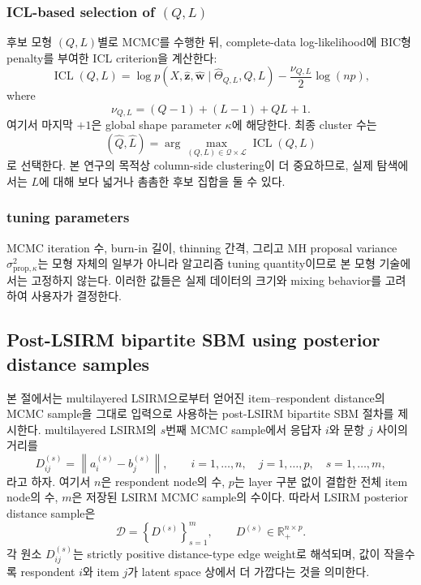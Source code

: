\documentclass[A4paper,11pt]{article}
\begin{document}
\subsubsection{ICL-based selection of $(Q,L)$}

후보 모형 $(Q,L)$별로 MCMC를 수행한 뒤, complete-data log-likelihood에 BIC형 penalty를 부여한 ICL criterion을 계산한다:
\[
\operatorname{ICL}(Q,L)
=
\log p(X,\hat{\mathbf{z}},\hat{\mathbf{w}}\mid \hat{\Theta}_{Q,L},Q,L)
-
\frac{\nu_{Q,L}}{2}\log(np),
\]
where
\[
\nu_{Q,L}=(Q-1)+(L-1)+QL+1.
\]
여기서 마지막 $+1$은 global shape parameter $\kappa$에 해당한다. 최종 cluster 수는
\[
(\hat Q,\hat L)
=
\arg\max_{(Q,L)\in\mathcal{Q}\times\mathcal{L}}
\operatorname{ICL}(Q,L)
\]
로 선택한다. 본 연구의 목적상 column-side clustering이 더 중요하므로, 실제 탐색에서는 $L$에 대해 보다 넓거나 촘촘한 후보 집합을 둘 수 있다.

\subsubsection{tuning parameters}

MCMC iteration 수, burn-in 길이, thinning 간격, 그리고 MH proposal variance $\sigma_{\text{prop},\kappa}^{2}$는 모형 자체의 일부가 아니라 알고리즘 tuning quantity이므로 본 모형 기술에서는 고정하지 않는다. 이러한 값들은 실제 데이터의 크기와 mixing behavior를 고려하여 사용자가 결정한다.



\subsection{Post-LSIRM bipartite SBM using posterior distance samples}

본 절에서는 multilayered LSIRM으로부터 얻어진 item--respondent distance의 MCMC sample을
그대로 입력으로 사용하는 post-LSIRM bipartite SBM 절차를 제시한다.
multilayered LSIRM의 $s$번째 MCMC sample에서 응답자 $i$와 문항 $j$ 사이의 거리를
\[
D^{(s)}_{ij}
=
\left\| a_i^{(s)} - b_j^{(s)} \right\|,
\qquad
i=1,\ldots,n,\quad j=1,\ldots,p,\quad s=1,\ldots,m,
\]
라고 하자. 여기서 $n$은 respondent node의 수, $p$는 layer 구분 없이 결합한 전체 item node의 수,
$m$은 저장된 LSIRM MCMC sample의 수이다. 따라서 LSIRM posterior distance sample은
\[
\mathcal{D}
=
\left\{D^{(s)}\right\}_{s=1}^m,
\qquad
D^{(s)} \in \mathbb{R}_{+}^{n \times p}.
\]
각 원소 $D^{(s)}_{ij}$는 strictly positive distance-type edge weight로 해석되며, 값이 작을수록
respondent $i$와 item $j$가 latent space 상에서 더 가깝다는 것을 의미한다.
\end{document}
